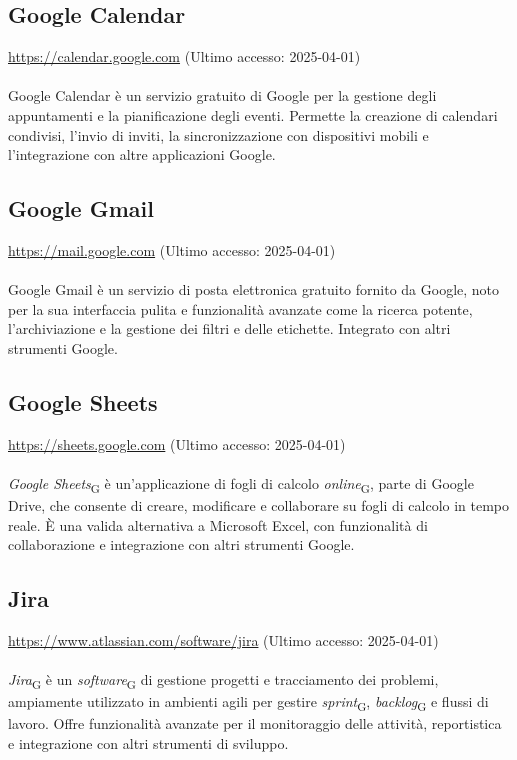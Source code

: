 \subsection{Google Calendar}
\label{Google Calendar}
\href{https://calendar.google.com}{https://calendar.google.com} (Ultimo accesso: 2025-04-01) \\ \\  
Google Calendar è un servizio gratuito di Google per la gestione degli appuntamenti e la pianificazione degli eventi. Permette la creazione di calendari condivisi, l'invio di inviti, la sincronizzazione con dispositivi mobili e l'integrazione con altre applicazioni Google.

\subsection{Google Gmail}
\label{Google Gmail}
\href{https://mail.google.com}{https://mail.google.com} (Ultimo accesso: 2025-04-01) \\ \\  
Google Gmail è un servizio di posta elettronica gratuito fornito da Google, noto per la sua interfaccia pulita e funzionalità avanzate come la ricerca potente, l'archiviazione e la gestione dei filtri e delle etichette. Integrato con altri strumenti Google.

\subsection{Google Sheets}
\label{Google Sheets}
\href{https://sheets.google.com}{https://sheets.google.com} (Ultimo accesso: 2025-04-01) \\ \\  
\textit{Google Sheets}\textsubscript{G} è un'applicazione di fogli di calcolo \textit{online}\textsubscript{G}, parte di Google Drive, che consente di creare, modificare e collaborare su fogli di calcolo in tempo reale. È una valida alternativa a Microsoft Excel, con funzionalità di collaborazione e integrazione con altri strumenti Google.

\subsection{Jira}
\label{Jira}
\href{https://www.atlassian.com/software/jira}{https://www.atlassian.com/software/jira} (Ultimo accesso: 2025-04-01) \\ \\  
\textit{Jira}\textsubscript{G} è un \textit{software}\textsubscript{G} di gestione progetti e tracciamento dei problemi, ampiamente utilizzato in ambienti agili per gestire \textit{sprint}\textsubscript{G}, \textit{backlog}\textsubscript{G} e flussi di lavoro. Offre funzionalità avanzate per il monitoraggio delle attività, reportistica e integrazione con altri strumenti di sviluppo.


